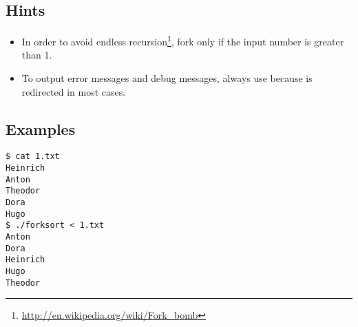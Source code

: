 

\subsection*{Hints}

\begin{itemize}
\item In order to avoid endless recursion\footnote{\url{http://en.wikipedia.org/wiki/Fork\_bomb}},
fork only if the input number is greater than 1.
\item To output error messages and debug messages, always use
 because  is redirected in most cases.
\end{itemize}

\subsection*{Examples}
\begin{verbatim}
$ cat 1.txt
Heinrich
Anton
Theodor
Dora
Hugo
$ ./forksort < 1.txt
Anton
Dora
Heinrich
Hugo
Theodor
\end{verbatim}

\osueguidelinestwo


